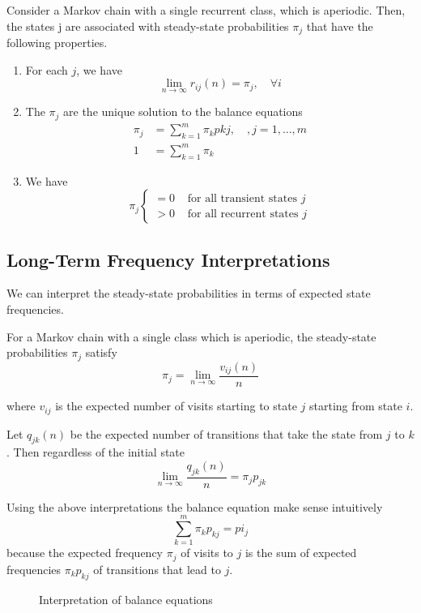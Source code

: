 \begin{theorem}
    Consider a Markov chain with a single recurrent class, which is aperiodic. Then, the states j are associated with steady-state probabilities $\pi_{j}$ that have the following properties.
    \begin{enumerate}
        \item For each $j$, we have 
        \[\lim_{n\to \infty} r_{ij}(n)=\pi_j, \quad \forall i\]
        \item The $\pi_j$ are the unique solution to the balance equations
        \begin{align*}
            \pi_j &= \sum_{k=1}^m \pi_k p{kj}, \quad, j=1,
            \ldots, m\\
            1 &= \sum_{k=1}^m \pi_k
        \end{align*}
        \item We have \[\pi_j \begin{cases}
            =0 & \text{ for all transient states }j \\
            >0 & \text{ for all recurrent states }j
        \end{cases}\]
    \end{enumerate}
\end{theorem}

\subsection{Long-Term Frequency Interpretations}

We can interpret the steady-state probabilities in terms of expected state frequencies.

For a Markov chain with a single class which is aperiodic, the steady-state probabilities $\pi_j$ satisfy
\[\pi_j=\lim_{n\to \infty}\frac{v_{ij}(n)}{n}\]

where $v_{ij}$ is the expected number of visits starting to state $j$ starting from state $i$.

Let $q_{jk}(n)$ be the expected number of transitions that take the state from $j$ to $k$. Then regardless of the initial state
\[\lim_{n \to \infty}\frac{q_{jk}(n)}{n}=\pi_j p_{jk}\]

Using the above interpretations the balance equation make sense intuitively
\[\sum_{k=1}^m\pi_k p_{kj}=pi_j\]
because the expected frequency $\pi_j$ of visits to $j$ is the sum of expected frequencies $\pi_k p_{kj}$ of transitions that lead to $j$.

\begin{figure}[!h]
    \centering
    
    \caption{Interpretation of balance equations}
 \end{figure}

